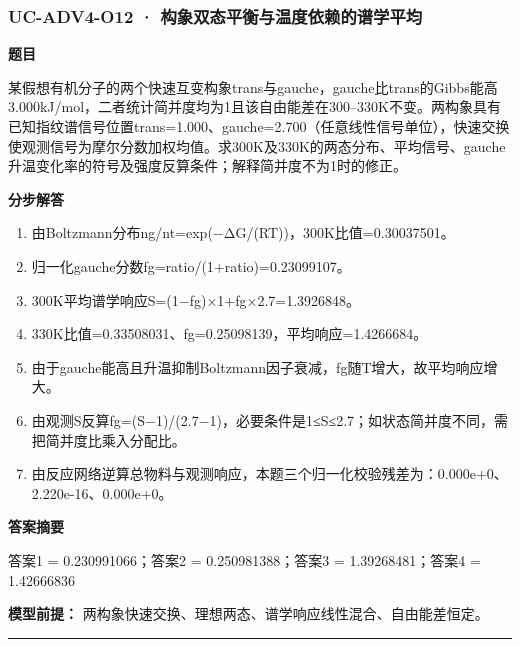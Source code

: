 \documentclass[UTF8,11pt,a4paper]{ctexart}
\begin{document}
\subsubsection*{UC-ADV4-O12 · 构象双态平衡与温度依赖的谱学平均}
\noindent\textbf{题目}\par
某假想有机分子的两个快速互变构象trans与gauche，gauche比trans的Gibbs能高3.000kJ/mol，二者统计简并度均为1且该自由能差在300–330K不变。两构象具有已知指纹谱信号位置trans=1.000、gauche=2.700（任意线性信号单位），快速交换使观测信号为摩尔分数加权均值。求300K及330K的两态分布、平均信号、gauche升温变化率的符号及强度反算条件；解释简并度不为1时的修正。\par
\medskip\noindent\textbf{分步解答}
\begin{enumerate}
\item 由Boltzmann分布ng/nt=exp(−ΔG/(RT))，300K比值=0.30037501。
\item 归一化gauche分数fg=ratio/(1+ratio)=0.23099107。
\item 300K平均谱学响应S=(1−fg)×1+fg×2.7=1.3926848。
\item 330K比值=0.33508031、fg=0.25098139，平均响应=1.4266684。
\item 由于gauche能高且升温抑制Boltzmann因子衰减，fg随T增大，故平均响应增大。
\item 由观测S反算fg=(S−1)/(2.7−1)，必要条件是1≤S≤2.7；如状态简并度不同，需把简并度比乘入分配比。
\item 由反应网络逆算总物料与观测响应，本题三个归一化校验残差为：0.000e+0、2.220e-16、0.000e+0。
\end{enumerate}
\noindent\textbf{答案摘要}\par
答案1 = 0.230991066；答案2 = 0.250981388；答案3 = 1.39268481；答案4 = 1.42666836\par
\noindent\textbf{模型前提：}
两构象快速交换、理想两态、谱学响应线性混合、自由能差恒定。\par
\medskip\hrule\medskip
{}
\end{document}
